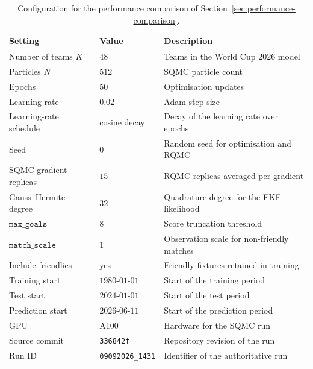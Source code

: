 \begin{table}[H]
\centering
\begin{tabularx}{\textwidth}{lXX}
\toprule
Setting & Value & Description \\
\midrule
Number of teams $K$ & $48$ & Teams in the World Cup 2026 model \\
Particles $N$ & $512$ & SQMC particle count \\
Epochs & $50$ & Optimisation updates \\
Learning rate & $0.02$ & Adam step size \\
Learning-rate schedule & cosine decay & Decay of the learning rate over epochs \\
Seed & $0$ & Random seed for optimisation and RQMC \\
SQMC gradient replicas & $15$ & RQMC replicas averaged per gradient \\
Gauss--Hermite degree & $32$ & Quadrature degree for the EKF likelihood \\
$\texttt{max\_goals}$ & $8$ & Score truncation threshold \\
$\texttt{match\_scale}$ & $1$ & Observation scale for non-friendly matches \\
Include friendlies & yes & Friendly fixtures retained in training \\
Training start & $1980\text{-}01\text{-}01$ & Start of the training period \\
Test start & $2024\text{-}01\text{-}01$ & Start of the test period \\
Prediction start & $2026\text{-}06\text{-}11$ & Start of the prediction period \\
GPU & A100 & Hardware for the SQMC run \\
Source commit & \texttt{336842f} & Repository revision of the run \\
Run ID & \texttt{09092026\_1431} & Identifier of the authoritative run \\
\bottomrule
\end{tabularx}
\caption{Configuration for the performance comparison of Section~\ref{sec:performance-comparison}.}
\label{tab:config}
\end{table}
